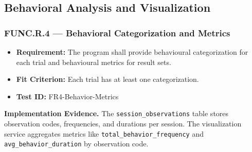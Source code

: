 \documentclass[12pt, titlepage]{article}
\begin{document}
\subsection{Behavioral Analysis and Visualization}

\subsubsection{FUNC.R.4 --- Behavioral Categorization and Metrics}

\begin{itemize}
  \item \textbf{Requirement:} The program shall provide behavioural categorization for each trial and behavioural metrics for result sets.
  \item \textbf{Fit Criterion:} Each trial has at least one categorization.
  \item \textbf{Test ID:} FR4-Behavior-Metrics
\end{itemize}

\begin{sloppypar}
\noindent\textbf{Implementation Evidence.}
The \texttt{session\_observations} table stores observation codes, frequencies, and durations per session.
The visualization service aggregates metrics like \texttt{total\_behavior\_frequency} and
\texttt{avg\_behavior\_duration} by observation code.
\end{sloppypar}
\end{document}
